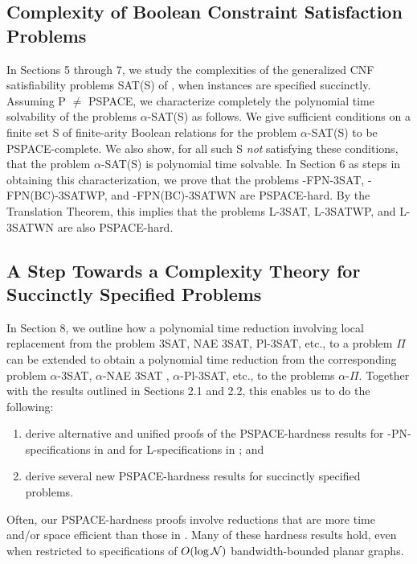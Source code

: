\subsection{ Complexity of Boolean Constraint Satisfaction Problems}\label{sec:sat}
In Sections 5 through  7, we study the complexities 
of the 
 generalized {\sf CNF}  satisfiability problems {\sf SAT(S)} of \cite{Sc78},
when instances are specified succinctly.
Assuming {\sf P} $\neq$ {\sf PSPACE}, we characterize completely 
the polynomial time solvability of the problems  $\alpha$-{\sf SAT(S)} as follows. We give sufficient conditions on a finite set {\sf S} of finite-arity 
Boolean relations for the problem  $\alpha$-{\sf SAT(S)} to be 
{\sf PSPACE-}complete. We also show, for all such {\sf S} {\em not}
 satisfying 
these conditions, that the problem $\alpha$-{\sf SAT(S)} is polynomial 
time solvable. In Section 6 as steps in obtaining this characterization,
we prove that the problems {-FPN-3SAT}, {-FPN(BC)-3SATWP}, and 
{-FPN(BC)-3SATWN} are {\sf PSPACE-}hard. By the Translation
Theorem, this implies that the problems {\sf L-3SAT}, {\sf L-3SATWP},
and {\sf L-3SATWN} are also {\sf PSPACE-}hard.




\subsection{A Step Towards a Complexity Theory for Succinctly Specified 
Problems}
In Section 8, we outline how a polynomial time reduction involving
local replacement \cite{GJ79} from the problem 
{\sf 3SAT, NAE 3SAT, Pl-3SAT,} etc., to a problem $\Pi$ can be extended
to obtain a polynomial time reduction from the corresponding problem 
$\alpha$-{\sf 3SAT}, $\alpha$-{\sf NAE 3SAT} ,
 $\alpha$-{\sf Pl-3SAT}, etc., to the problems
 $\alpha$-$\Pi$. Together with the results outlined in 
Sections 2.1 and 2.2, this enables us to do the following:
\begin{enumerate}
\item derive alternative and unified proofs of the {\sf PSPACE-}hardness 
results for {-PN-} specifications in \cite{Or82a} and for
 {\sf L-}specifications in \cite{LW92}; and 
\item derive several new {\sf PSPACE-}hardness results for succinctly 
specified problems. 
\end{enumerate}

Often, our {\sf PSPACE-}hardness  proofs involve 
reductions that are more time and/or space efficient than those in 
\cite{Or82a,LW92}. Many of these hardness results hold, even when 
restricted to specifications of $O(\log {\cal N})$ 
bandwidth-bounded planar graphs.
 





